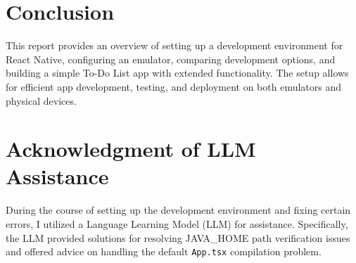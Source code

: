 \documentclass{article}
\begin{document}
\section{Conclusion}
This report provides an overview of setting up a development environment for React Native, configuring an emulator, comparing development options, and building a simple To-Do List app with extended functionality. The setup allows for efficient app development, testing, and deployment on both emulators and physical devices.

\section{Acknowledgment of LLM Assistance}
During the course of setting up the development environment and fixing certain errors, I utilized a Language Learning Model (LLM) for assistance. Specifically, the LLM provided solutions for resolving JAVA\_HOME path verification issues and offered advice on handling the default \texttt{App.tsx} compilation problem.
\end{document}
